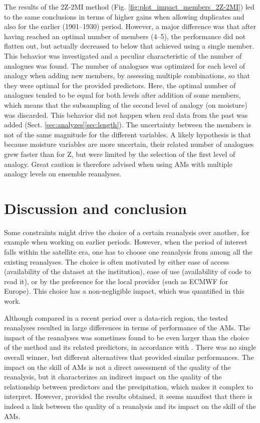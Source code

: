 \documentclass{ametsoc}
\begin{document}
	The results of the 2Z-2MI method (Fig. \ref{fig:plot_impact_members_2Z-2MI}) led to the same conclusions in terms of higher gains when allowing duplicates and also for the earlier (1901--1930) period. However, a major difference was that after having reached an optimal number of members (4--5), the performance did not flatten out, but actually decreased to below that achieved using a single member. This behavior was investigated and a peculiar characteristic of the number of analogues was found. The number of analogues was optimized for each level of analogy when adding new members, by assessing multiple combinations, so that they were optimal for the provided predictors. Here, the optimal number of analogues tended to be equal for both levels after addition of some members, which means that the subsampling of the second level of analogy (on moisture) was discarded. This behavior did not happen when real data from the past was added (Sect. \ref{sec:analyzes}\ref{sec:length}). The uncertainty between the members is not of the same magnitude for the different variables. A likely hypothesis is that because moisture variables are more uncertain, their related number of analogues grew faster than for Z, but were limited by the selection of the first level of analogy. Great caution is therefore advised when using AMs with multiple analogy levels on ensemble reanalyses.
	
	
	\section{Discussion and conclusion}
	\label{sec:discussion-conclusion}
	
	Some constraints might drive the choice of a certain reanalysis over another, for example when working on earlier periods. However, when the period of interest falls within the satellite era, one has to choose one reanalysis from among all the existing reanalyses. The choice is often motivated by either ease of access (availability of the dataset at the institution), ease of use (availability of code to read it), or by the preference for the local provider (such as ECMWF for Europe). This choice has a non-negligible impact, which was quantified in this work.
	
	Although compared in a recent period over a data-rich region, the tested reanalyses resulted in large differences in terms of performance of the AMs. The impact of the reanalyses was sometimes found to be even larger than the choice of the method and its related predictors, in accordance with \citet{Dayon2015}. There was no single overall winner, but different alternatives that provided similar performances. The impact on the skill of AMs is not a direct assessment of the quality of the reanalysis, but it characterizes an indirect impact on the quality of the relationship between predictors and the precipitation, which makes it complex to interpret. However, provided the results obtained, it seems manifest that there is indeed a link between the quality of a reanalysis and its impact on the skill of the AMs.
	
\end{document}
